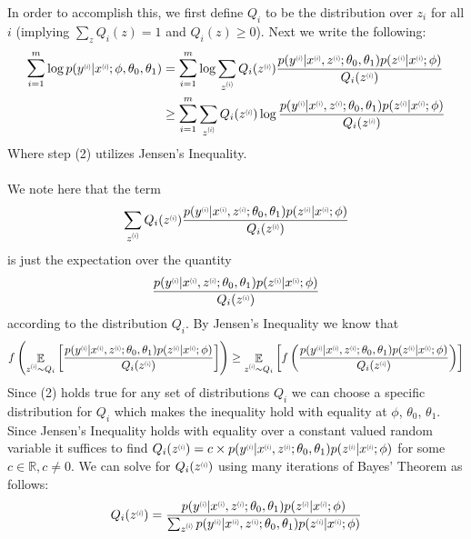 \documentclass{article}
\newcommand{\supi}{\scalebox{0.6}[0.75]{$^{(i)}$}}
\newcommand{\sumim}{\begin{align*}
    \sum_{i=1}^m
\end{align*}
}
\begin{document}
\begin{enumerate}[label=(\alph*)]
     In order to accomplish this, we first define $Q_i$ to be the distribution over $z_i$ for all $i$ (implying $\sum_z Q_i(z) = 1$ and $Q_i(z) \geq 0$). Next we write the following:
     \begin{align}
         \sumim\log p(y\supi|x\supi;\phi,\theta_0, \theta_1)&{}=
         \sumim \log\sum_{z\supi} Q_i(z\supi)\frac{p(y\supi|x\supi, z\supi;\theta_0, \theta_1)p(z\supi|x\supi;\phi)}{Q_i(z\supi)}\\
         &{}\geq\sumim\sum_{z\supi} Q_i(z\supi)\log\frac{p(y\supi|x\supi, z\supi;\theta_0, \theta_1)p(z\supi|x\supi;\phi)}{Q_i(z\supi)}
     \end{align}
     Where step (2) utilizes Jensen's Inequality.\\\\
     We note here that the term
     \begin{align*}
         \sum_{z\supi} Q_i(z\supi)\frac{p(y\supi|x\supi, z\supi;\theta_0, \theta_1)p(z\supi|x\supi;\phi)}{Q_i(z\supi)}
     \end{align*}
     is just the expectation over the quantity 
     \begin{align*}
        \frac{p(y\supi|x\supi, z\supi;\theta_0, \theta_1)p(z\supi|x\supi;\phi)}{Q_i(z\supi)}
     \end{align*}
     according to the distribution $Q_i$. By Jensen's Inequality we know that
     \begin{align*}
         f\left(\mathop{\mathbb{E}}_{z\supi \mathtt{\sim} Q_i}\left[\frac{p(y\supi|x\supi, z\supi;\theta_0, \theta_1)p(z\supi|x\supi;\phi)}{Q_i(z\supi)}\right]\right) \geq \mathop{\mathbb{E}}_{z\supi \mathtt{\sim} Q_i}\left[f\left(\frac{p(y\supi|x\supi, z\supi;\theta_0, \theta_1)p(z\supi|x\supi;\phi)}{Q_i(z\supi)}\right)\right]
     \end{align*}
     Since (2) holds true for any set of distributions $Q_i$ we can choose a specific distribution for $Q_i$ which makes the inequality hold with equality at $\phi$, $\theta_0$, $\theta_1$. Since Jensen's Inequality holds with equality over a constant valued random variable it suffices to find $Q_i(z\supi) = c \times p(y\supi|x\supi, z\supi;\theta_0, \theta_1)p(z\supi|x\supi;\phi) $ for some $c \in \mathbb{R}, c \neq 0$. We can solve for $Q_i(z\supi)$ using many iterations of Bayes' Theorem as follows:
     \begin{align*}
         Q_i(z\supi) &{}=
         \frac{p(y\supi|x\supi, z\supi;\theta_0, \theta_1)p(z\supi|x\supi;\phi)}{\sum_{z\supi}p(y\supi|x\supi, z\supi;\theta_0, \theta_1)p(z\supi|x\supi;\phi)}\\

\end{align*}
\end{enumerate}
\end{document}
